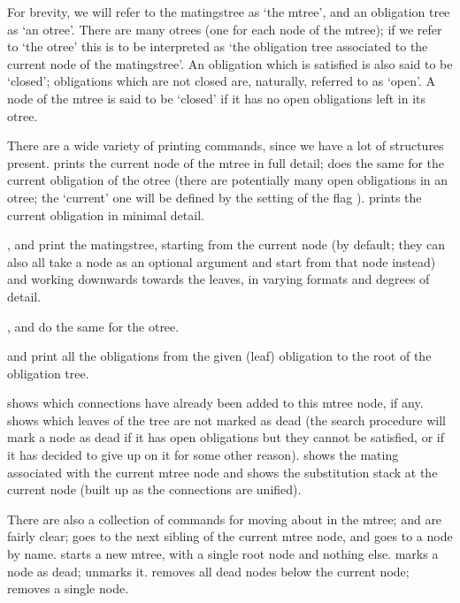 For brevity, we will refer to the matingstree as `the mtree', and an obligation tree
as `an otree'. There are many otrees (one for each node of the mtree); if we refer to `the otree'
this is to be interpreted as `the obligation tree associated to the current node of the
matingstree'. An obligation which is satisfied is also said to be `closed'; obligations
which are not closed are, naturally, referred to as `open'. A node of the mtree is said
to be `closed' if it has no open obligations left in its otree.

There are a wide variety of printing commands, since we have a lot of structures present.
 prints the current node of the mtree in full detail; 
does the same for the current obligation of the otree (there are potentially many open obligations
in an otree; the `current' one will be defined by the setting of the flag ).
 prints the current obligation in minimal detail.

,  and  print the matingstree, starting from
the current node (by default; they can also all take a node as an optional argument and start from that node instead)
and working downwards towards the leaves, in varying formats and degrees of detail.

,  and  do the same for the otree.

 and  print all the obligations from the given (leaf) obligation
to the root of the obligation tree.

 shows which connections have already been added to this mtree node, if any.
 shows which leaves of the tree are not marked as dead (the search procedure will mark a
node as dead if it has open obligations but they cannot be satisfied, or if it has decided to give up on it for
some other reason).
 shows the mating associated with the current mtree node and 
shows the substitution stack at the current node (built up as the connections are unified).

There are also a collection of commands for moving about in the mtree;  and 
are fairly clear;  goes to the next sibling of the current mtree node, and 
goes to a node by name.  starts a new mtree, with a single root node and nothing else.
 marks a node as dead;  unmarks it.  removes
all dead nodes below the current node;  removes a single node.

